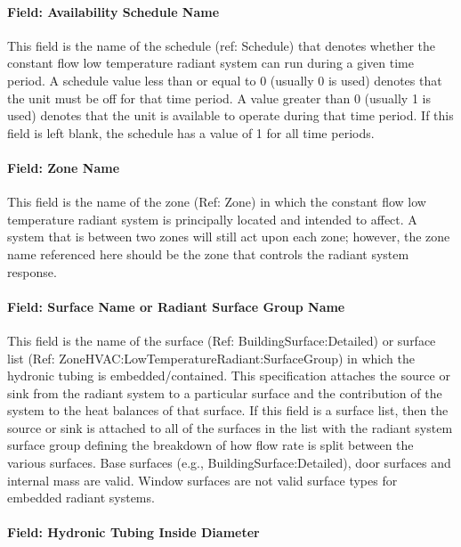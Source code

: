 \paragraph{Field: Availability Schedule Name}\label{field-availability-schedule-name-6-003}

This field is the name of the schedule (ref: Schedule) that denotes whether the constant flow low temperature radiant system can run during a given time period. A schedule value less than or equal to 0 (usually 0 is used) denotes that the unit must be off for that time period. A value greater than 0 (usually 1 is used) denotes that the unit is available to operate during that time period. If this field is left blank, the schedule has a value of 1 for all time periods.

\paragraph{Field: Zone Name}\label{field-zone-name-1-007}

This field is the name of the zone (Ref: Zone) in which the constant flow low temperature radiant system is principally located and intended to affect. A system that is between two zones will still act upon each zone; however, the zone name referenced here should be the zone that controls the radiant system response.

\paragraph{Field: Surface Name or Radiant Surface Group Name}\label{field-surface-name-or-radiant-surface-group-name-1}

This field is the name of the surface (Ref: BuildingSurface:Detailed) or surface list (Ref: ZoneHVAC:LowTemperatureRadiant:SurfaceGroup) in which the hydronic tubing is embedded/contained. This specification attaches the source or sink from the radiant system to a particular surface and the contribution of the system to the heat balances of that surface. If this field is a surface list, then the source or sink is attached to all of the surfaces in the list with the radiant system surface group defining the breakdown of how flow rate is split between the various surfaces. Base surfaces (e.g., BuildingSurface:Detailed), door surfaces and internal mass are valid. Window surfaces are not valid surface types for embedded radiant systems.

\paragraph{Field: Hydronic Tubing Inside Diameter}\label{field-hydronic-tubing-inside-diameter-1-000}

